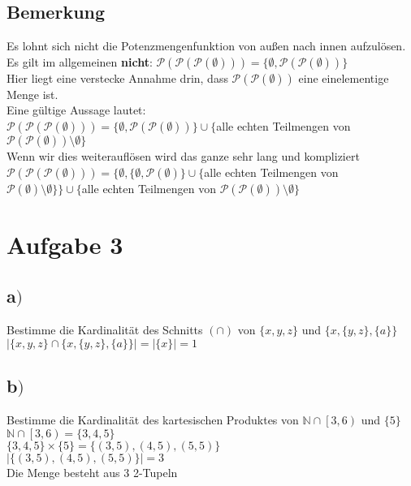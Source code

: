 \documentclass[18pt,a4paper]{article}
\begin{document}
	\subsection*{Bemerkung}
	Es lohnt sich nicht die Potenzmengenfunktion von au{\ss}en nach innen aufzul\"osen.\\
	Es gilt im allgemeinen \textbf{nicht}: $\mathcal{P}(\mathcal{P}(\mathcal{P}(\emptyset))) = \{\emptyset , \mathcal{P}(\mathcal{P}(\emptyset)) \}$\\
	Hier liegt eine verstecke Annahme drin, dass $\mathcal{P}(\mathcal{P}(\emptyset))$ eine einelementige Menge ist.\\
	Eine g\"ultige Aussage lautet:\\
	$\mathcal{P}(\mathcal{P}(\mathcal{P}(\emptyset))) = \{\emptyset , \mathcal{P}(\mathcal{P}(\emptyset)) \} \cup \{$alle echten Teilmengen von $\mathcal{P}(\mathcal{P}(\emptyset))\setminus\emptyset\}$\\
	Wenn wir dies weiteraufl\"osen wird das ganze sehr lang und kompliziert\\
	$\mathcal{P}(\mathcal{P}(\mathcal{P}(\emptyset))) = \{\emptyset , \{\emptyset , \mathcal{P}(\emptyset)\} \cup \{ $alle echten Teilmengen von $\mathcal{P}(\emptyset)\setminus\emptyset\}\} \cup \{$alle echten Teilmengen von $\mathcal{P}(\mathcal{P}(\emptyset))\setminus\emptyset\}$\\
	
	
	\section*{Aufgabe 3}
	\subsection*{a$)$}
	Bestimme die Kardinalit\"at des Schnitts  $(\cap)$  von $\{x, y, z\}$ und $\{x, \{y, z\}, \{a\}\}$\\
	$\lvert\{x, y, z\} \cap \{x, \{y, z\}, \{a\}\} \rvert = \lvert\{x{}\}\rvert = 1$
	
	\subsection*{b$)$}
	Bestimme die Kardinalit\"at des kartesischen Produktes von $\mathbb{N} \cap \left[3,6 \right)$ und $\{5\}$\\
	\doublespacing
	$\mathbb{N} \cap \left[3,6 \right) = \{3,4,5\}$\\
	$\{3,4,5\} \times \{5\}=\{(3,5),(4,5),(5,5)\}$\\
	$\lvert \{(3,5),(4,5),(5,5)\} \rvert = 3$\\
	Die Menge besteht aus 3 2-Tupeln
	\singlespacing
\end{document}
